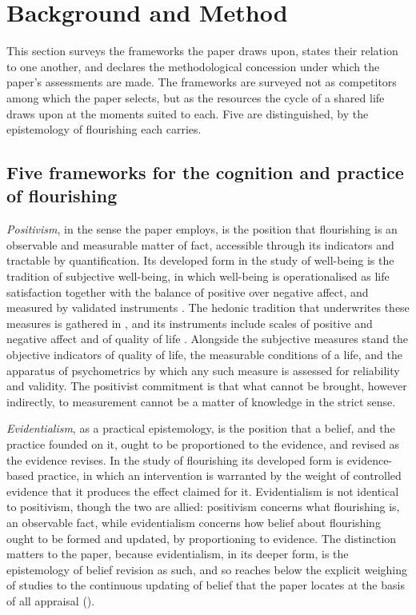 \section{Background and Method}
\label{p11:sec:background}

\noindent
This section surveys the frameworks the paper draws upon, states their relation to one another, and declares the methodological concession under which the paper's assessments are made. The frameworks are surveyed not as competitors among which the paper selects, but as the resources the cycle of a shared life draws upon at the moments suited to each. Five are distinguished, by the epistemology of flourishing each carries.

\subsection{Five frameworks for the cognition and practice of flourishing}
\label{p11:sec:bg-five}

\emph{Positivism}, in the sense the paper employs, is the position that flourishing is an observable and measurable matter of fact, accessible through its indicators and tractable by quantification. Its developed form in the study of well-being is the tradition of subjective well-being, in which well-being is operationalised as life satisfaction together with the balance of positive over negative affect, and measured by validated instruments \parencite{diener1985}. The hedonic tradition that underwrites these measures is gathered in \textcite{kahneman1999}, and its instruments include scales of positive and negative affect \parencite{watson1988} and of quality of life \parencite{whoqol1998}. Alongside the subjective measures stand the objective indicators of quality of life, the measurable conditions of a life, and the apparatus of psychometrics by which any such measure is assessed for reliability and validity. The positivist commitment is that what cannot be brought, however indirectly, to measurement cannot be a matter of knowledge in the strict sense.

\emph{Evidentialism}, as a practical epistemology, is the position that a belief, and the practice founded on it, ought to be proportioned to the evidence, and revised as the evidence revises. In the study of flourishing its developed form is evidence-based practice, in which an intervention is warranted by the weight of controlled evidence that it produces the effect claimed for it. Evidentialism is not identical to positivism, though the two are allied: positivism concerns what flourishing is, an observable fact, while evidentialism concerns how belief about flourishing ought to be formed and updated, by proportioning to evidence. The distinction matters to the paper, because evidentialism, in its deeper form, is the epistemology of belief revision as such, and so reaches below the explicit weighing of studies to the continuous updating of belief that the paper locates at the basis of all appraisal ().

